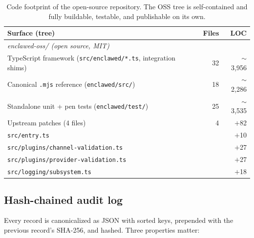 \documentclass[11pt]{article}
\begin{document}
\begin{table}[t]
  \centering
  \small
  \begin{tabular}{|l|r|r|}
    \hline
    \textbf{Surface (tree)} & \textbf{Files} & \textbf{LOC} \\
    \hline
    \multicolumn{3}{|l|}{\emph{enclawed-oss/ (open source, MIT)}} \\
    \hline
    TypeScript framework (\texttt{src/enclawed/*.ts}, integration shims) & 32 & $\sim$3{,}956 \\
    \hline
    Canonical \texttt{.mjs} reference (\texttt{enclawed/src/}) & 18 & $\sim$2{,}286 \\
    \hline
    Standalone unit + pen tests (\texttt{enclawed/test/}) & 25 & $\sim$3{,}535 \\
    \hline
    Upstream patches (4 files) & 4 & $+$82 \\
    \quad \texttt{src/entry.ts} & & $+$10 \\
    \quad \texttt{src/plugins/channel-validation.ts} & & $+$27 \\
    \quad \texttt{src/plugins/provider-validation.ts} & & $+$27 \\
    \quad \texttt{src/logging/subsystem.ts} & & $+$18 \\
    \hline
  \end{tabular}
  \caption{Code footprint of the open-source repository. The OSS tree
  is self-contained and fully buildable, testable, and publishable on
  its own.}
  \label{tab:loc}
\end{table}

\subsection{Hash-chained audit log}

Every record is canonicalized as JSON with sorted keys, prepended with
the previous record's SHA-256, and hashed. Three properties matter:
\end{document}
